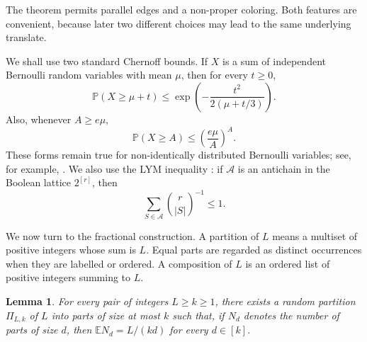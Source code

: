 \documentclass[twoside,12pt]{article}
\numberwithin{equation}{section}
\newtheorem{lemma}[theorem]{Lemma}
\newcommand{\E}{\mathbb{E}}
\newcommand{\Prob}{\mathbb{P}}
\begin{document}
The theorem permits parallel edges and a non-proper coloring.  Both features
are convenient, because later two different choices may lead to the same
underlying translate.

We shall use two standard Chernoff bounds.  If $X$ is a sum of independent
Bernoulli random variables with mean $\mu$, then for every $t\ge0$,
\begin{equation}\label{eq:chernoff-additive}
        \Prob(X\ge\mu+t)
        \le \exp\!\left(-\frac{t^2}{2(\mu+t/3)}\right).
\end{equation}
Also, whenever $A\ge e\mu$,
\begin{equation}\label{eq:chernoff-large}
        \Prob(X\ge A)\le\left(\frac{e\mu}{A}\right)^A .
\end{equation}
These forms remain true for non-identically distributed Bernoulli variables;
see, for example, \cite{AlonSpencer}.  We also use the LYM inequality
\cite{Lubell}: if $\mathcal A$ is an antichain in the Boolean lattice
$2^{[r]}$, then
\begin{equation}\label{eq:LYM}
        \sum_{S\in\mathcal A}\binom{r}{|S|}^{-1}\le1.
\end{equation}

We now turn to the fractional construction.  A partition of $L$ means a
multiset of positive integers whose sum is $L$.  Equal parts are regarded as
distinct occurrences when they are labelled or ordered.  A composition of $L$
is an ordered list of positive integers summing to $L$.

\begin{lemma}\label{lem:harmonic-partition}
For every pair of integers $L\ge k\ge1$, there exists a random partition
$\Pi_{L,k}$ of $L$ into parts of size at most $k$ such that, if $N_d$ denotes
the number of parts of size $d$, then $\E N_d=L/(kd)$ for every $d\in[k]$.
\end{lemma}
\end{document}

